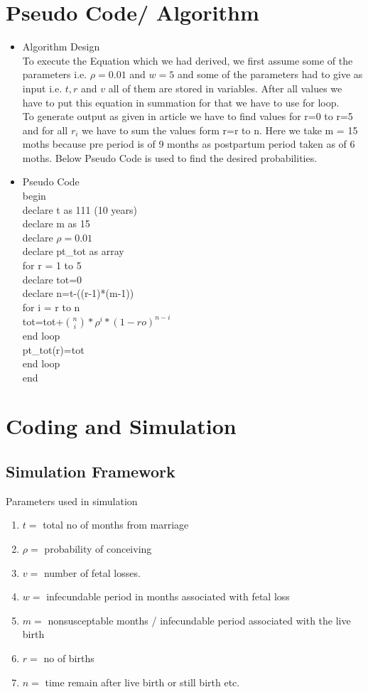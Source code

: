 \documentclass{article}
\begin{document}
\section{Pseudo Code/ Algorithm }
\begin{itemize}
    \item Algorithm Design\\
    To execute the Equation which we had derived, we first assume some of the parameters i.e. $\rho=0.01$ and $w=5$ and some of the parameters had to give as input i.e. $t,r$ and $v$ all of them are stored in variables. After all values we have to put this equation in summation for that we have to use for loop. \\
    To generate output as given in article we have to find values for r=0 to r=5
    and for all $r_i$ we have to sum the values form r=r to n. Here we take m = 15 moths because pre period is of 9 months as postpartum period taken as of 6 moths. Below Pseudo Code is used to find the desired probabilities.
    \item Pseudo Code\\
    begin\\
    declare t as 111 (10 years)\\
    declare m as 15\\
    declare $\rho=0.01$\\
    declare pt\_tot as array\\
    for r = 1  to 5\\
    declare tot=0\\
    declare n=t-((r-1)*(m-1))\\
    for i = r to n\\
    tot=tot+$\binom{n}{i}*\rho^i*(1-ro)^{n-i}$\\
    end loop\\
    pt\_tot(r)=tot\\
    end loop\\
    end
  \end{itemize}
\section{Coding and Simulation} 
\subsection{Simulation Framework}
\justify Parameters used in simulation
\begin{enumerate}
  \item $t=$ total no of months from marriage
  \item $\rho=$ probability of conceiving
  \item $v=$ number of fetal losses.
  \item $w=$ infecundable period in months associated with fetal loss
  \item $m=$ nonsusceptable months / infecundable period associated with the live birth
  \item $r=$ no of births
  \item $n=$ time remain after live birth or still birth etc.
\end{enumerate}
\end{document}
